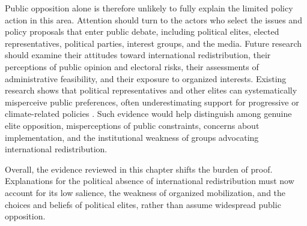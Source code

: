 
Public opposition alone is therefore unlikely to fully explain the limited policy action in this area. Attention should turn to the actors who select the issues and policy proposals that enter public debate, including political elites, elected representatives, political parties, interest groups, and the media. Future research should examine their attitudes toward international redistribution, their perceptions of public opinion and electoral risks, their assessments of administrative feasibility, and their exposure to organized interests. Existing research shows that political representatives and other elites can systematically misperceive public preferences, often underestimating support for progressive or climate-related policies \citep{mildenberger_beliefs_2017,broockman_bias_2018,pilet_politicians_2023}. Such evidence would help distinguish among genuine elite opposition, misperceptions of public constraints, concerns about implementation, and the institutional weakness of groups advocating international redistribution.

Overall, the evidence reviewed in this chapter shifts the burden of proof. Explanations for the political absence of international redistribution must now account for its low salience, the weakness of organized mobilization, and the choices and beliefs of political elites, rather than assume widespread public opposition.

